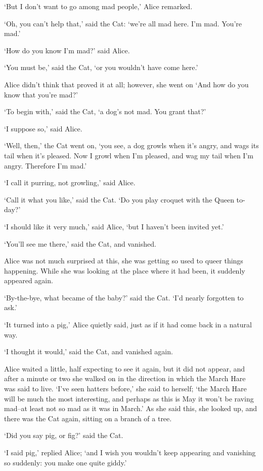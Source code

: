   `But I don't want to go among mad people,' Alice remarked.

  `Oh, you can't help that,' said the Cat:  `we're all mad here.
I'm mad.  You're mad.'

  `How do you know I'm mad?' said Alice.

  `You must be,' said the Cat, `or you wouldn't have come here.'

  Alice didn't think that proved it at all; however, she went on
`And how do you know that you're mad?'

  `To begin with,' said the Cat, `a dog's not mad.  You grant
that?'

  `I suppose so,' said Alice.

  `Well, then,' the Cat went on, `you see, a dog growls when it's
angry, and wags its tail when it's pleased.  Now I growl when I'm
pleased, and wag my tail when I'm angry.  Therefore I'm mad.'

  `I call it purring, not growling,' said Alice.

  `Call it what you like,' said the Cat.  `Do you play croquet
with the Queen to-day?'

  `I should like it very much,' said Alice, `but I haven't been
invited yet.'

  `You'll see me there,' said the Cat, and vanished.

  Alice was not much surprised at this, she was getting so used
to queer things happening.  While she was looking at the place
where it had been, it suddenly appeared again.

  `By-the-bye, what became of the baby?' said the Cat.  `I'd
nearly forgotten to ask.'

  `It turned into a pig,' Alice quietly said, just as if it had
come back in a natural way.

  `I thought it would,' said the Cat, and vanished again.

  Alice waited a little, half expecting to see it again, but it
did not appear, and after a minute or two she walked on in the
direction in which the March Hare was said to live.  `I've seen
hatters before,' she said to herself; `the March Hare will be
much the most interesting, and perhaps as this is May it won't be
raving mad--at least not so mad as it was in March.'  As she said
this, she looked up, and there was the Cat again, sitting on a
branch of a tree.

  `Did you say pig, or fig?' said the Cat.

  `I said pig,' replied Alice; `and I wish you wouldn't keep
appearing and vanishing so suddenly:  you make one quite giddy.'


